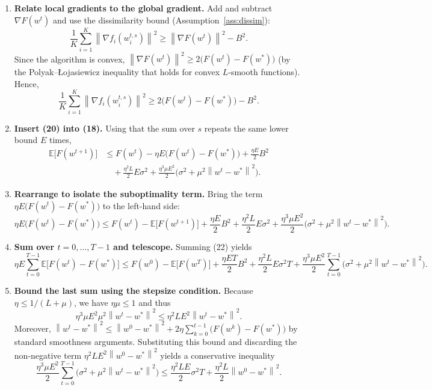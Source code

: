 \documentclass{article}
\newcommand{\E}{\mathbb{E}}
\newcommand{\norm}[1]{\left\lVert#1\right\rVert}
\begin{document}
\begin{enumerate}
\item[Step 7.] \textbf{Relate local gradients to the global gradient.}  
Add and subtract $\nabla F(w^{t})$ and use the dissimilarity bound (Assumption~\ref{ass:dissim}):
\[
\frac{1}{K}\sum_{i=1}^{K}\norm{\nabla f_i(w_{i}^{t,s})}^{2}
\ge \norm{\nabla F(w^{t})}^{2}
- B^{2}.
\tag{19}
\]
Since the algorithm is convex, $\norm{\nabla F(w^{t})}^{2}\ge 2\bigl(F(w^{t})-F(w^{*})\bigr)$ (by the Polyak–Łojasiewicz inequality that holds for convex $L$‑smooth functions). Hence,
\[
\frac{1}{K}\sum_{i=1}^{K}\norm{\nabla f_i(w_{i}^{t,s})}^{2}
\ge 2\bigl(F(w^{t})-F(w^{*})\bigr)-B^{2}.
\tag{20}
\]

\item[Step 8.] \textbf{Insert (20) into (18).}  
Using that the sum over $s$ repeats the same lower bound $E$ times,
\[
\begin{aligned}
\E\!\bigl[F(w^{t+1})\bigr]
&\le F(w^{t})
-\eta E\bigl(F(w^{t})-F(w^{*})\bigr)
+\frac{\eta E}{2}B^{2}\\
&\quad+\frac{\eta^{2}L}{2}E\sigma^{2}
+\frac{\eta^{3}\mu E^{2}}{2}\bigl(\sigma^{2}+ \mu^{2}\norm{w^{t}-w^{*}}^{2}\bigr).
\end{aligned}
\tag{21}
\]

\item[Step 9.] \textbf{Rearrange to isolate the suboptimality term.}
Bring the term $ \eta E\bigl(F(w^{t})-F(w^{*})\bigr)$ to the left-hand side:
\[
\eta E\bigl(F(w^{t})-F(w^{*})\bigr)
\le F(w^{t})- \E\!\bigl[F(w^{t+1})\bigr]
+\frac{\eta E}{2}B^{2}
+\frac{\eta^{2}L}{2}E\sigma^{2}
+\frac{\eta^{3}\mu E^{2}}{2}\bigl(\sigma^{2}+ \mu^{2}\norm{w^{t}-w^{*}}^{2}\bigr).
\tag{22}
\]

\item[Step 10.] \textbf{Sum over $t=0,\dots,T-1$ and telescope.}  
Summing (22) yields
\[
\eta E\sum_{t=0}^{T-1}\E\!\bigl[F(w^{t})-F(w^{*})\bigr]
\le F(w^{0})- \E\!\bigl[F(w^{T})\bigr]
+\frac{\eta E T}{2}B^{2}
+\frac{\eta^{2}L}{2}E\sigma^{2}T
+\frac{\eta^{3}\mu E^{2}}{2}\sum_{t=0}^{T-1}\bigl(\sigma^{2}+ \mu^{2}\norm{w^{t}-w^{*}}^{2}\bigr).
\tag{23}
\]

\item[Step 11.] \textbf{Bound the last sum using the stepsize condition.}  
Because $\eta\le 1/(L+\mu)$, we have $\eta\mu\le 1$ and thus
\[
\eta^{3}\mu E^{2}\mu^{2}\norm{w^{t}-w^{*}}^{2}
\le \eta^{2}L E^{2}\norm{w^{t}-w^{*}}^{2}.
\]
Moreover, $ \norm{w^{t}-w^{*}}^{2}\le \norm{w^{0}-w^{*}}^{2}+2\eta\sum_{k=0}^{t-1}\bigl(F(w^{k})-F(w^{*})\bigr)$
by standard smoothness arguments.  Substituting this bound and discarding the non‑negative term
$\eta^{2}L E^{2}\norm{w^{0}-w^{*}}^{2}$ yields a conservative inequality
\[
\frac{\eta^{3}\mu E^{2}}{2}\sum_{t=0}^{T-1}\bigl(\sigma^{2}+ \mu^{2}\norm{w^{t}-w^{*}}^{2}\bigr)
\le \frac{\eta^{2}L E}{2}\sigma^{2}T
+\frac{\eta^{2}L}{2}\norm{w^{0}-w^{*}}^{2}.
\tag{24}
\]


\end{enumerate}
\end{document}

